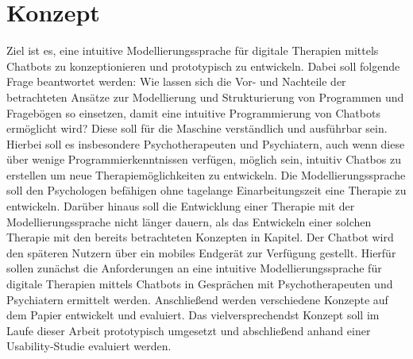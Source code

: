\section{Konzept}
\label{ch:Konzept}
Ziel ist es, eine intuitive Modellierungssprache für digitale Therapien mittels Chatbots zu konzeptionieren und prototypisch zu entwickeln. Dabei soll folgende Frage beantwortet werden: Wie lassen sich die Vor- und Nachteile der betrachteten Ansätze zur Modellierung und Strukturierung von Programmen und Fragebögen so einsetzen, damit eine intuitive Programmierung von Chatbots ermöglicht wird? Diese soll für die Maschine verständlich und ausführbar sein. Hierbei soll es insbesondere Psychotherapeuten und Psychiatern, auch wenn diese über wenige Programmierkenntnissen verfügen, möglich sein, intuitiv Chatbos zu erstellen um neue Therapiemöglichkeiten zu entwickeln. Die Modellierungssprache soll den Psychologen befähigen ohne tagelange Einarbeitungszeit eine Therapie zu entwickeln. Darüber hinaus soll die Entwicklung einer Therapie mit der Modellierungssprache nicht länger dauern, als das Entwickeln einer solchen Therapie mit den bereits betrachteten Konzepten in Kapitel. Der Chatbot wird den späteren Nutzern über ein mobiles Endgerät zur Verfügung gestellt. Hierfür sollen zunächst die Anforderungen an eine intuitive Modellierungssprache für digitale Therapien mittels Chatbots in Gesprächen mit Psychotherapeuten und Psychiatern ermittelt werden. Anschließend werden verschiedene Konzepte auf dem Papier entwickelt und evaluiert. Das vielversprechendst Konzept soll im Laufe dieser Arbeit prototypisch umgesetzt und abschließend anhand einer Usability-Studie evaluiert werden. 